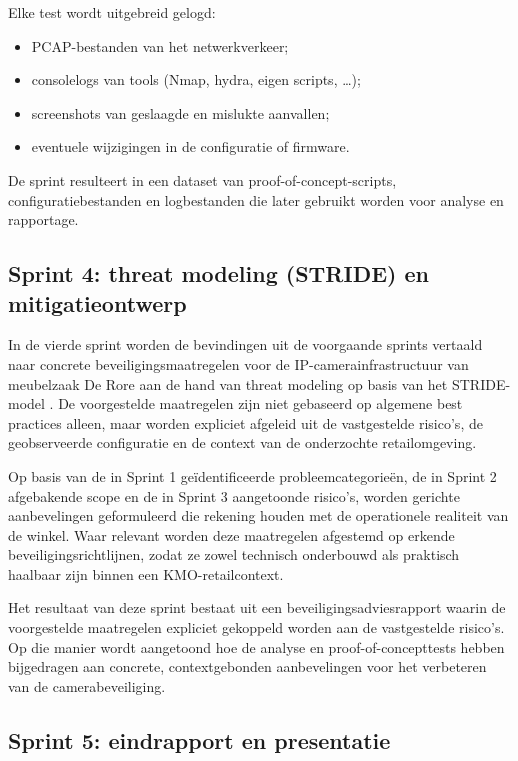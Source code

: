 Elke test wordt uitgebreid gelogd:
\begin{itemize}
    \item PCAP-bestanden van het netwerkverkeer;
    \item consolelogs van tools (Nmap, hydra, eigen scripts, \dots);
    \item screenshots van geslaagde en mislukte aanvallen;
    \item eventuele wijzigingen in de configuratie of firmware.
\end{itemize}

De sprint resulteert in een dataset van proof-of-concept-scripts, configuratiebestanden en logbestanden die later gebruikt worden voor analyse en rapportage.

\subsection*{Sprint 4: threat modeling (STRIDE) en mitigatieontwerp}
In de vierde sprint worden de bevindingen uit de voorgaande sprints vertaald naar concrete beveiligingsmaatregelen voor de IP-camerainfrastructuur van meubelzaak De Rore aan de hand van threat modeling op basis van het STRIDE-model \parencite{Microsoft2022bSTRIDE}. De voorgestelde maatregelen zijn niet gebaseerd op algemene best practices alleen, maar worden expliciet afgeleid uit de vastgestelde risico’s, de geobserveerde configuratie en de context van de onderzochte retailomgeving.

Op basis van de in Sprint 1 geïdentificeerde probleemcategorieën, de in Sprint 2 afgebakende scope en de in Sprint 3 aangetoonde risico’s, worden gerichte aanbevelingen geformuleerd die rekening houden met de operationele realiteit van de winkel. Waar relevant worden deze maatregelen afgestemd op erkende beveiligingsrichtlijnen, zodat ze zowel technisch onderbouwd als praktisch haalbaar zijn binnen een KMO-retailcontext.

Het resultaat van deze sprint bestaat uit een beveiligingsadviesrapport waarin de voorgestelde maatregelen expliciet gekoppeld worden aan de vastgestelde risico’s. Op die manier wordt aangetoond hoe de analyse en proof-of-concepttests hebben bijgedragen aan concrete, contextgebonden aanbevelingen voor het verbeteren van de camerabeveiliging.

\subsection*{Sprint 5: eindrapport en presentatie}


